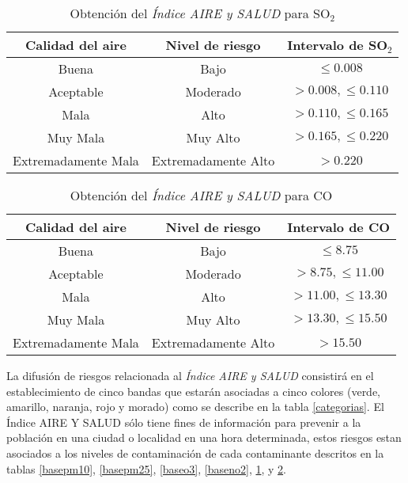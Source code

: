 \begin{table}[H]
\centering
\caption{Obtención del {\em Índice AIRE y SALUD} para SO$_{2}$}
\begin{adjustbox}{max width=0.9\textwidth}
\begin{tabular}{|c|c|c|}
\hline
Calidad del aire & Nivel de riesgo & Intervalo de SO$_{2}$ \\ \hline
Buena &Bajo &$\leq0.008$ \\
Aceptable &Moderado &$>0.008, \leq0.110$ \\
Mala &Alto &$>0.110, \leq0.165$ \\
Muy Mala &Muy Alto &$>0.165, \leq0.220$ \\
Extremadamente Mala &Extremadamente Alto &$>0.220$ \\ \hline
\end{tabular}
\end{adjustbox}
\label{baseso2}
\end{table}

\begin{table}[H]
\centering
\caption{Obtención del {\em Índice AIRE y SALUD} para CO}
\begin{adjustbox}{max width=0.9\textwidth}
\begin{tabular}{|c|c|c|}
\hline
Calidad del aire & Nivel de riesgo & Intervalo de CO \\ \hline
Buena &Bajo &$\leq8.75$ \\
Aceptable &Moderado &$>8.75, \leq11.00$  \\
Mala &Alto &$>11.00, \leq13.30$ \\
Muy Mala &Muy Alto &$>13.30, \leq15.50$ \\
Extremadamente Mala &Extremadamente Alto &$>15.50$ \\ \hline 
\end{tabular}
\end{adjustbox}
\label{baseco}
\end{table}


La difusión de riesgos relacionada al {\em Índice AIRE y SALUD} consistirá en el establecimiento de cinco bandas que estarán asociadas a cinco colores (verde, amarillo, naranja, rojo y morado) como se describe en la tabla \ref{categorias}. El Índice AIRE Y SALUD sólo tiene fines de información para prevenir a la población en una ciudad o localidad en una hora determinada, estos riesgos estan asociados a los niveles de contaminación de cada contaminante descritos en la tablas \ref{basepm10}, \ref{basepm25}, \ref{baseo3}, \ref{baseno2}, \ref{baseso2}, y \ref{baseco}.

